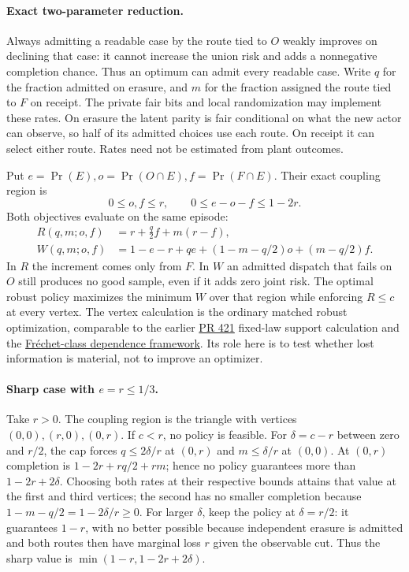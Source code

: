 \documentclass[11pt]{article}
\begin{document}
\paragraph{Exact two-parameter reduction.}
Always admitting a readable case by the route tied to $O$ weakly improves on declining that case: it cannot increase the union risk and adds a nonnegative completion chance. Thus an optimum can admit every readable case. Write $q$ for the fraction admitted on erasure, and $m$ for the fraction assigned the route tied to $F$ on receipt. The private fair bits and local randomization may implement these rates. On erasure the latent parity is fair conditional on what the new actor can observe, so half of its admitted choices use each route. On receipt it can select either route. Rates need not be estimated from plant outcomes.
 
Put $e=\Pr(E), o=\Pr(O\cap E), f=\Pr(F\cap E)$. Their exact coupling region is
\[
0\le o,f\le r,\qquad 0\le e-o-f\le 1-2r.
\]
Both objectives evaluate on the same episode:
\[
\begin{aligned}
R(q,m;o,f)&=r+\tfrac q2 f+m(r-f),\\
W(q,m;o,f)&=1-e-r+qe+(1-m-q/2)o+(m-q/2)f.
\end{aligned}
\]
In $R$ the increment comes only from $F$. In $W$ an admitted dispatch that fails on $O$ still produces no good sample, even if it adds zero joint risk. The optimal robust policy maximizes the minimum $W$ over that region while enforcing $R\le c$ at every vertex. The vertex calculation is the ordinary matched robust optimization, comparable to the earlier \href{https://github.com/eternal-november/eos-research-programmes/pull/421}{PR 421} fixed-law support calculation and the \href{https://arxiv.org/abs/1709.00641}{Fr\'echet-class dependence framework}. Its role here is to test whether lost information is material, not to improve an optimizer.

\paragraph{Sharp case with $e=r\le1/3$.}
Take $r>0$. The coupling region is the triangle with vertices $(0,0),(r,0),(0,r)$. If $c<r$, no policy is feasible. For $\delta=c-r$ between zero and $r/2$, the cap forces $q\le 2\delta/r$ at $(0,r)$ and $m\le\delta/r$ at $(0,0)$. At $(0,r)$ completion is $1-2r+rq/2+rm$; hence no policy guarantees more than $1-2r+2\delta$. Choosing both rates at their respective bounds attains that value at the first and third vertices; the second has no smaller completion because $1-m-q/2=1-2\delta/r\ge0$. For larger $\delta$, keep the policy at $\delta=r/2$: it guarantees $1-r$, with no better possible because independent erasure is admitted and both routes then have marginal loss $r$ given the observable cut. Thus the sharp value is $\min(1-r,1-2r+2\delta)$.
\end{document}
